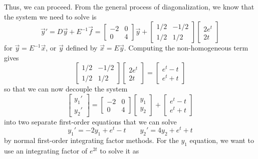 \begin{exampleSol}
Thus, we can proceed. From the general process of diagonalization, we know that the system we need to solve is
\begin{equation*}
\vec{y}' = D\vec{y} + E^{-1}\vec{f} = \begin{bmatrix} -2 & 0 \\ 0 & 4 \end{bmatrix} \vec{y} + \begin{bmatrix} 1/2 & -1/2 \\ 1/2 & 1/2 \end{bmatrix} \begin{bmatrix} 2e^t \\ 2t \end{bmatrix}
\end{equation*}
for $\vec{y} = E^{-1}\vec{x}$, or $\vec{y}$ defined by $\vec{x} = E\vec{y}$. Computing the non-homogeneous term gives
\begin{equation*}
\begin{bmatrix} 1/2 & -1/2 \\ 1/2 & 1/2 \end{bmatrix} \begin{bmatrix} 2e^t \\ 2t \end{bmatrix} = \begin{bmatrix} e^t - t \\ e^t + t \end{bmatrix}
\end{equation*}
so that we can now decouple the system
\begin{equation*}
\begin{bmatrix} y_1' \\ y_2' \end{bmatrix}  = \begin{bmatrix} -2 & 0 \\ 0 & 4 \end{bmatrix} \begin{bmatrix} y_1 \\ y_2 \end{bmatrix} + \begin{bmatrix} e^t - t \\ e^t + t \end{bmatrix}
\end{equation*}
into two separate first-order equations that we can solve
\begin{equation*}
y_1' = -2y_1 + e^t - t \qquad y_2' = 4y_2 + e^t + t
\end{equation*}
by normal first-order integrating factor methods. For the $y_1$ equation, we want to use an integrating factor of $e^{2t}$ to solve it as

\end{exampleSol}
